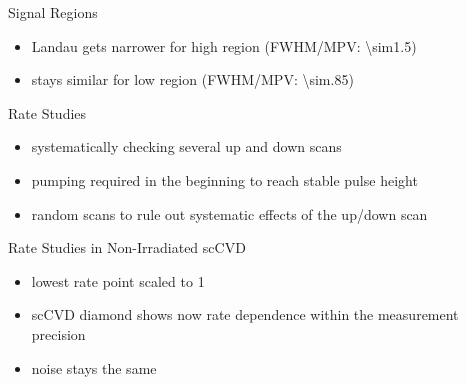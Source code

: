 \begin{frame}{Signal Regions}
 
	\vspace*{-15pt}
	\vspace*{-15pt}
	
	\begin{itemize} \itemfill
		\item Landau gets narrower for high region (FWHM/MPV: \SI{\sim1.5}{})
		\item stays similar for low region (FWHM/MPV: \SI{\sim.85}{})
	\end{itemize}
 
\end{frame}
\begin{frame}{Rate Studies}

	
	\vspace*{-15pt}
	
	\begin{itemize}
		\item systematically checking several up and down scans
		\item pumping required in the beginning to reach stable pulse height
		\item random scans to rule out systematic effects of the up/down scan
	\end{itemize}
	
\end{frame}
\begin{frame}{Rate Studies in Non-Irradiated scCVD}

	
	
	\begin{itemize}\itemfill
		\item lowest rate point scaled to 1
		\item scCVD diamond shows now rate dependence within the measurement precision
		\item noise stays the same
	\end{itemize}
	
\end{frame}
